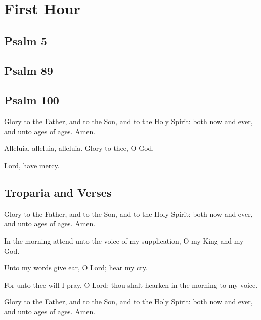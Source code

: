 \section{First Hour}



\subsection{Psalm 5}



\subsection{Psalm 89}



\subsection{Psalm 100}



Glory to the Father, and to the Son, and to the Holy Spirit: both now and ever, and unto ages of ages. Amen.

Alleluia, alleluia, alleluia. Glory to thee, O God. 

Lord, have mercy. 

\subsection{Troparia and Verses}


Glory to the Father, and to the Son, and to the Holy Spirit: both now and ever, and unto ages of ages. Amen.

In the morning attend unto the voice of my supplication, O my King and my God. 

 Unto my words give ear, O Lord; hear my cry. 

 For unto thee will I pray, O Lord: thou shalt hearken in the morning to my voice. 

Glory to the Father, and to the Son, and to the Holy Spirit: both now and ever, and unto ages of ages. Amen.

